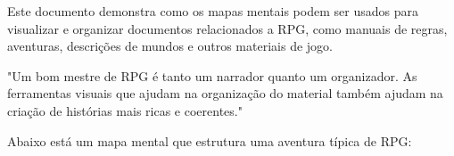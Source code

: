 \documentclass[12pt, a4paper]{book}
\begin{document}


Este documento demonstra como os mapas mentais podem ser usados para visualizar e organizar documentos relacionados a RPG, como manuais de regras, aventuras, descrições de mundos e outros materiais de jogo.

\begin{quotebox}
"Um bom mestre de RPG é tanto um narrador quanto um organizador. As ferramentas visuais que ajudam na organização do material também ajudam na criação de histórias mais ricas e coerentes."
\end{quotebox}


Abaixo está um mapa mental que estrutura uma aventura típica de RPG:
\end{document}
